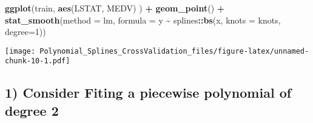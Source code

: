 \documentclass[
]{article}
\newenvironment{Shaded}{\begin{snugshade}}{\end{snugshade}}
\newcommand{\AttributeTok}[1]{\textcolor[rgb]{0.13,0.29,0.53}{#1}}
\newcommand{\CommentTok}[1]{\textcolor[rgb]{0.56,0.35,0.01}{\textit{#1}}}
\newcommand{\DecValTok}[1]{\textcolor[rgb]{0.00,0.00,0.81}{#1}}
\newcommand{\FloatTok}[1]{\textcolor[rgb]{0.00,0.00,0.81}{#1}}
\newcommand{\FunctionTok}[1]{\textcolor[rgb]{0.13,0.29,0.53}{\textbf{#1}}}
\newcommand{\NormalTok}[1]{#1}
\newcommand{\OtherTok}[1]{\textcolor[rgb]{0.56,0.35,0.01}{#1}}
\newcommand{\SpecialCharTok}[1]{\textcolor[rgb]{0.81,0.36,0.00}{\textbf{#1}}}
\begin{document}
\begin{Shaded}
\begin{Highlighting}[]
\FunctionTok{ggplot}\NormalTok{(train, }\FunctionTok{aes}\NormalTok{(LSTAT, MEDV) ) }\SpecialCharTok{+} \FunctionTok{geom\_point}\NormalTok{() }\SpecialCharTok{+}
\FunctionTok{stat\_smooth}\NormalTok{(}\AttributeTok{method =}\NormalTok{ lm, }\AttributeTok{formula =}\NormalTok{ y }\SpecialCharTok{\textasciitilde{}}\NormalTok{ splines}\SpecialCharTok{::}\FunctionTok{bs}\NormalTok{(x, }\AttributeTok{knots =}\NormalTok{ knots, }\AttributeTok{degree=}\DecValTok{1}\NormalTok{))}
\end{Highlighting}
\end{Shaded}

\texttt{[image: Polynomial\_Splines\_CrossValidation\_files/figure-latex/unnamed-chunk-10-1.pdf]}

\hypertarget{consider-fiting-a-piecewise-polynomial-of-degree-2}{%
\subsection{1) Consider Fiting a piecewise polynomial of degree
2}\label{consider-fiting-a-piecewise-polynomial-of-degree-2}}

\begin{Shaded}
\end{Shaded}
\end{document}
